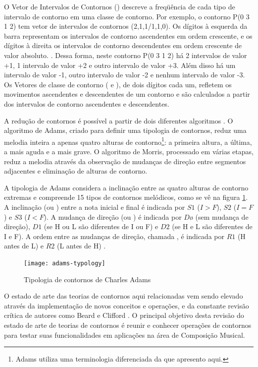 O Vetor de Intervalos de Contornos () descreve a freqüência de
cada tipo de intervalo de contorno em uma classe de contorno. Por
exemplo, o contorno P(0 3 1 2) tem vetor de intervalos de contornos
(2,1,1/1,1,0). Os dígitos à esquerda da barra representam os
intervalos de contorno ascendentes em ordem crescente, e os dígitos à
direita os intervalos de contorno descendentes em ordem crescente de
valor absoluto. \cite{friedmann85:methodology}. Dessa forma, neste
contorno P(0 3 1 2) há 2 intervalos de valor +1, 1 intervalo de valor
+2 e outro intervalo de valor +3. Além disso há um intervalo de valor
-1, outro intervalo de valor -2 e nenhum intervalo de valor -3. Os
Vetores de classe de contorno ( e ), de dois
dígitos cada um, refletem os movimentos ascendentes e descendentes de
um contorno e são calculados a partir dos intervalos de contorno
ascendentes e descendentes.

A redução de contornos é possível a partir de dois diferentes
algoritmos \cite{adams76:melodic,morris93:directions}. O algoritmo de
Adams, criado para definir uma tipologia de contornos, reduz uma
melodia inteira a apenas quatro alturas de contorno\footnote{Adams
  utiliza uma terminologia diferenciada da que apresento aqui.}: a
primeira altura, a última, a mais aguda e a mais grave. O algoritmo de
Morris, processado em várias etapas, reduz a melodia através da
observação de mudanças de direção entre segmentos adjacentes e
eliminação de alturas de contorno.

A tipologia de Adams considera a inclinação entre as quatro alturas de
contorno extremas e compreende 15 tipos de contornos melódicos, como
se vê na figura \ref{fig:adams-typology}. A inclinação (ou
) entre a nota inicial e final é indicada por $S1$ ($I >
F$), $S2$ ($I = F$) e $S3$ ($I < F$). A mudança de direção (ou
) é indicada por $Dø$ (sem mudança de direção), $D1$
(se H ou L são diferentes de I ou F) e $D2$ (se H e L são diferentes
de I e F). A ordem entre as mudanças de direção, chamada
, é indicada por $R1$ (H antes de L) e $R2$ (L antes
de H) \cite{adams76:melodic}.

\begin{figure}
  \centering
  \texttt{[image: adams-typology]}
  \caption{Tipologia de contornos de Charles Adams}
  \label{fig:adams-typology}
\end{figure}

O estado de arte das teorias de contornos aqui relacionadas vem sendo
elevado através da implementação de novos conceitos e operações, e da
constante revisão crítica de autores como Beard e Clifford
\cite{beard03:contour,clifford95:contour}. O principal objetivo desta
revisão do estado de arte de teorias de contornos é reunir e conhecer
operações de contornos para testar suas funcionalidades em aplicações
na área de Composição Musical.

